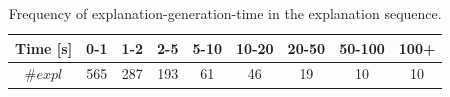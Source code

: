 % 

\begin{table}[!h]
	\centering
	\begin{adjustbox}{max width=\columnwidth}
\begin{tabular}{c|c|c|c|c|c|c|c|c}
	Time [s] &\textbf{0-1} & \textbf{1-2} & \textbf{2-5} & \textbf{5-10} & \textbf{10-20} & \textbf{20-50} & \textbf{50-100} & \textbf{100+}\\
	\midrule
	\rule{0pt}{2ex} $\# expl$ &565 & 287 & 193 & 61 & 46 & 19 & 10 & 10\\
\end{tabular}
\end{adjustbox}
	\caption{Frequency of explanation-generation-time in the explanation sequence.}
	\label{tab:explanation-time}
\end{table}

